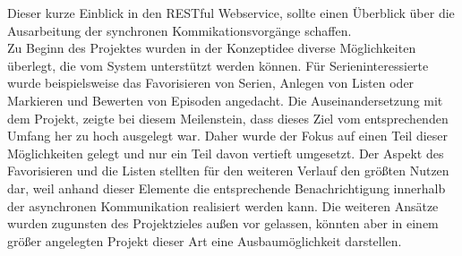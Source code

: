 Dieser kurze Einblick in den RESTful Webservice, sollte einen Überblick über die Ausarbeitung der synchronen Kommikationsvorgänge schaffen. \\
Zu Beginn des Projektes wurden in der Konzeptidee diverse Möglichkeiten überlegt, die vom System unterstützt werden können. Für Serieninteressierte wurde beispielsweise das Favorisieren von Serien, Anlegen von Listen oder Markieren und Bewerten von Episoden angedacht. Die Auseinandersetzung mit dem Projekt, zeigte bei diesem Meilenstein, dass dieses Ziel vom entsprechenden Umfang her zu hoch ausgelegt war. Daher wurde der Fokus auf einen Teil dieser Möglichkeiten gelegt und nur ein Teil davon vertieft umgesetzt. Der Aspekt des Favorisieren und die Listen stellten für den weiteren Verlauf den größten Nutzen dar, weil anhand dieser Elemente die entsprechende Benachrichtigung innerhalb der asynchronen Kommunikation realisiert werden kann. Die weiteren Ansätze wurden zugunsten des Projektzieles außen vor gelassen, könnten aber in einem größer angelegten Projekt dieser Art eine Ausbaumöglichkeit darstellen.




